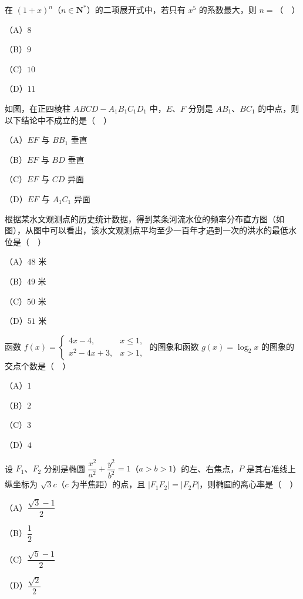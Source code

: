 \begin{question}
在 $(1+x)^n$（$n\in\mathbf N^*$）的二项展开式中，若只有 $x^5$ 的系数最大，则 $n=$（　）

（A）$8$

（B）$9$

（C）$10$

（D）$11$

\Needspace{0.4\textheight}
\end{question}
\begin{question}
如图，在正四棱柱 $ABCD-A_1B_1C_1D_1$ 中，$E$、$F$ 分别是 $AB_1$、$BC_1$ 的中点，则以下结论中不成立的是（　）
\nopagebreak[4]
\begin{center}\end{center}
\nopagebreak[4]
（A）$EF$ 与 $BB_1$ 垂直

（B）$EF$ 与 $BD$ 垂直

（C）$EF$ 与 $CD$ 异面

（D）$EF$ 与 $A_1C_1$ 异面

\Needspace{0.4\textheight}
\end{question}
\begin{question}
根据某水文观测点的历史统计数据，得到某条河流水位的频率分布直方图（如图），从图中可以看出，该水文观测点平均至少一百年才遇到一次的洪水的最低水位是（　）
\nopagebreak[4]
\begin{center}\end{center}
\nopagebreak[4]
（A）$48$ 米

（B）$49$ 米

（C）$50$ 米

（D）$51$ 米

\end{question}
\begin{question}
函数 $f(x)=\begin{cases}4x-4,&x\leqslant1,\\ x^2-4x+3,&x>1,\end{cases}$ 的图象和函数 $g(x)=\log_2 x$ 的图象的交点个数是（　）

（A）$1$

（B）$2$

（C）$3$

（D）$4$

\end{question}
\begin{question}
设 $F_1$、$F_2$ 分别是椭圆 $\dfrac{x^2}{a^2}+\dfrac{y^2}{b^2}=1$（$a>b>1$）的左、右焦点，$P$ 是其右准线上纵坐标为 $\sqrt3c$（$c$ 为半焦距）的点，且 $|F_1F_2|=|F_2P|$，则椭圆的离心率是（　）

（A）$\dfrac{\sqrt3-1}{2}$

（B）$\dfrac12$

（C）$\dfrac{\sqrt5-1}{2}$

（D）$\dfrac{\sqrt2}{2}$

\end{question}
